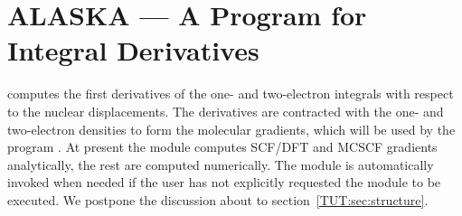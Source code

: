 \section{ALASKA --- A Program for Integral Derivatives}
\label{TUT:sec:alaska}

 computes the first derivatives of the one- and two-electron 
integrals with respect to the nuclear displacements. The derivatives are contracted
with the one- and two-electron densities to form the molecular gradients, which
will be used by the program . At present the 
module computes SCF/DFT and MCSCF gradients analytically, the rest are computed
numerically. The  module is automatically invoked when needed if
the user has not explicitly requested the module to be executed. We postpone the
discussion about  to section~\ref{TUT:sec:structure}.

